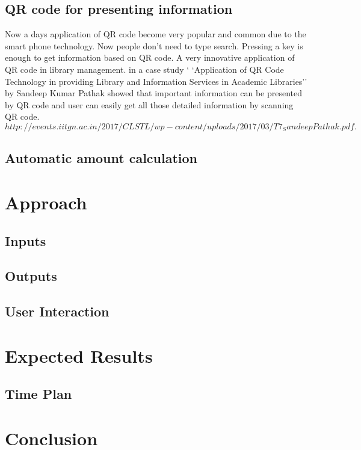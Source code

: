 \documentclass{sigchi}
\begin{document}
\subsection{QR code for presenting information}
Now a days application of QR code become very popular and common due to the smart phone technology. Now people don't need to type search. Pressing a key is enough to get information based on QR code. A very innovative application of QR code in library management. in a case study ` `Application of QR Code Technology in providing Library and Information Services in Academic Libraries'' by  Sandeep
Kumar Pathak showed that important information can be presented by QR code and user can easily get all those detailed information by scanning QR code. $http://events.iitgn.ac.in/2017/CLSTL/wp-content/uploads/2017/03/T7_SandeepPathak.pdf.$
\subsection{Automatic amount calculation}


\section{Approach}

\subsection{Inputs}
\subsection{Outputs}
\subsection{User Interaction}

\section{Expected Results}


\subsection{Time Plan}



\section{Conclusion}
\end{document}
